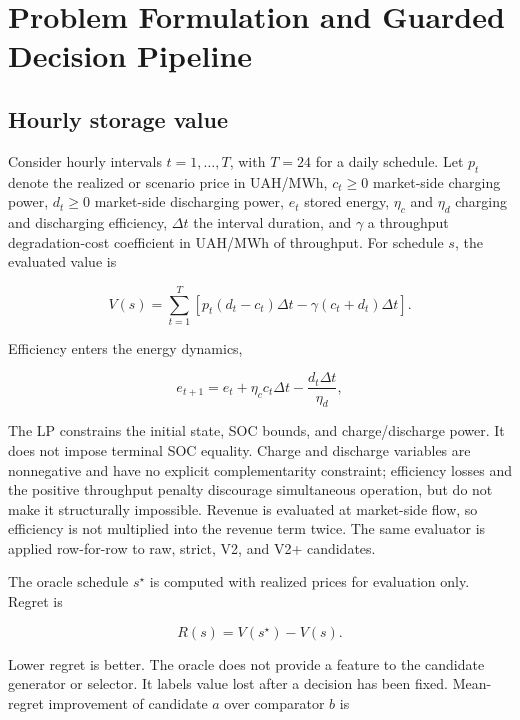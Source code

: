 \section{Problem Formulation and Guarded Decision Pipeline}

\subsection{Hourly storage value}

Consider hourly intervals $t=1,\ldots,T$, with $T=24$ for a daily schedule. Let $p_t$ denote the realized or scenario price in UAH/MWh, $c_t\geq 0$ market-side charging power, $d_t\geq 0$ market-side discharging power, $e_t$ stored energy, $\eta_c$ and $\eta_d$ charging and discharging efficiency, $\Delta t$ the interval duration, and $\gamma$ a throughput degradation-cost coefficient in UAH/MWh of throughput. For schedule $s$, the evaluated value is

\begin{equation}
V(s)=\sum_{t=1}^{T}\left[p_t(d_t-c_t)\Delta t-\gamma(c_t+d_t)\Delta t\right].
\end{equation}

Efficiency enters the energy dynamics,

\begin{equation}
e_{t+1}=e_t+\eta_c c_t\Delta t-\frac{d_t\Delta t}{\eta_d},
\end{equation}

The LP constrains the initial state, SOC bounds, and charge/discharge power. It does not impose terminal SOC equality. Charge and discharge variables are nonnegative and have no explicit complementarity constraint; efficiency losses and the positive throughput penalty discourage simultaneous operation, but do not make it structurally impossible. Revenue is evaluated at market-side flow, so efficiency is not multiplied into the revenue term twice. The same evaluator is applied row-for-row to raw, strict, V2, and V2+ candidates.

The oracle schedule $s^\star$ is computed with realized prices for evaluation only. Regret is

\begin{equation}
R(s)=V(s^\star)-V(s).
\end{equation}

Lower regret is better. The oracle does not provide a feature to the candidate generator or selector. It labels value lost after a decision has been fixed. Mean-regret improvement of candidate $a$ over comparator $b$ is

